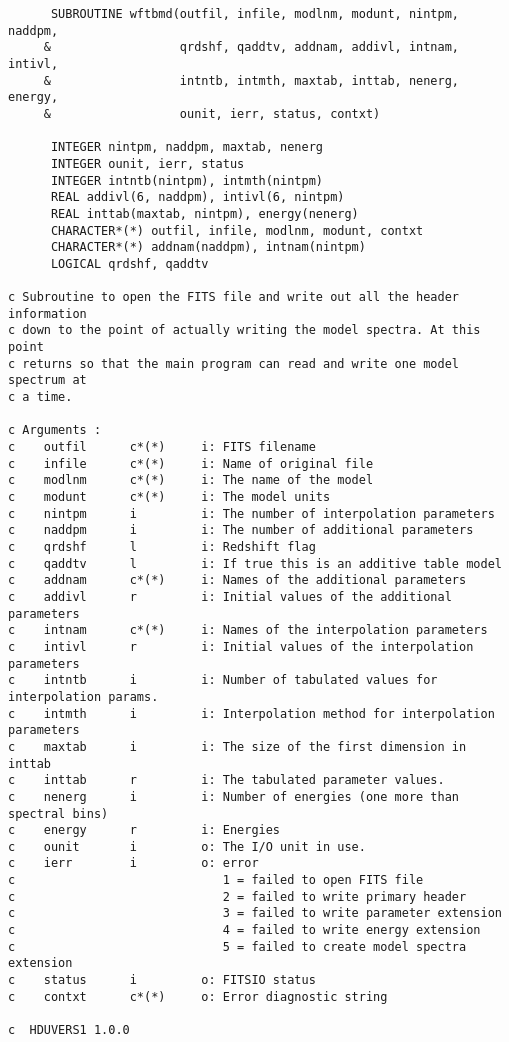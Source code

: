 \documentclass[11pt]{article}
\begin{document}
\begin{verbatim}
      SUBROUTINE wftbmd(outfil, infile, modlnm, modunt, nintpm, naddpm,
     &                  qrdshf, qaddtv, addnam, addivl, intnam, intivl, 
     &                  intntb, intmth, maxtab, inttab, nenerg, energy, 
     &                  ounit, ierr, status, contxt)

      INTEGER nintpm, naddpm, maxtab, nenerg
      INTEGER ounit, ierr, status
      INTEGER intntb(nintpm), intmth(nintpm)
      REAL addivl(6, naddpm), intivl(6, nintpm)
      REAL inttab(maxtab, nintpm), energy(nenerg)
      CHARACTER*(*) outfil, infile, modlnm, modunt, contxt
      CHARACTER*(*) addnam(naddpm), intnam(nintpm)
      LOGICAL qrdshf, qaddtv

c Subroutine to open the FITS file and write out all the header information
c down to the point of actually writing the model spectra. At this point
c returns so that the main program can read and write one model spectrum at
c a time.

c Arguments :
c    outfil      c*(*)     i: FITS filename
c    infile      c*(*)     i: Name of original file
c    modlnm      c*(*)     i: The name of the model
c    modunt      c*(*)     i: The model units
c    nintpm      i         i: The number of interpolation parameters
c    naddpm      i         i: The number of additional parameters
c    qrdshf      l         i: Redshift flag
c    qaddtv      l         i: If true this is an additive table model
c    addnam      c*(*)     i: Names of the additional parameters
c    addivl      r         i: Initial values of the additional parameters
c    intnam      c*(*)     i: Names of the interpolation parameters
c    intivl      r         i: Initial values of the interpolation parameters
c    intntb      i         i: Number of tabulated values for interpolation params.
c    intmth      i         i: Interpolation method for interpolation parameters
c    maxtab      i         i: The size of the first dimension in inttab
c    inttab      r         i: The tabulated parameter values.
c    nenerg      i         i: Number of energies (one more than spectral bins)
c    energy      r         i: Energies
c    ounit       i         o: The I/O unit in use.
c    ierr        i         o: error
c                             1 = failed to open FITS file
c                             2 = failed to write primary header
c                             3 = failed to write parameter extension
c                             4 = failed to write energy extension
c                             5 = failed to create model spectra extension
c    status      i         o: FITSIO status
c    contxt      c*(*)     o: Error diagnostic string

c  HDUVERS1 1.0.0
\end{verbatim}
\end{document}
